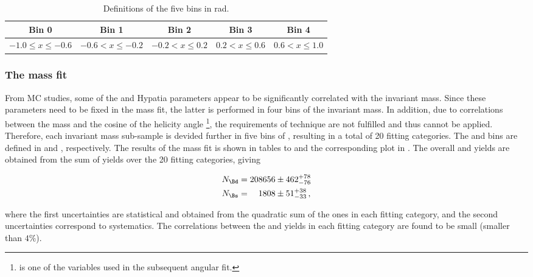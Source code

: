 \begin{table}[!h]
\begin{tabular}{c|c|c|c|c}
\hline
 Bin 0 & Bin 1 & Bin 2 & Bin 3 & Bin 4\\	
\hline
\multirow{2}{*}{$ -1.0 \leq x \leq -0.6 $} & \multirow{2}{*}{$ -0.6 < x \leq -0.2 $} & \multirow{2}{*}{$ -0.2 < x \leq 0.2 $}& \multirow{2}{*}{$ 0.2 < x \leq 0.6 $} & \multirow{2}{*}{$ 0.6 < x \leq 1.0 $} \\
					      	 					  &   &	& & \\	
\hline
 \end{tabular}
\caption{Definitions of the five \cosTmu bins in rad.}
\label{cosThateMubindef} 
\end{table}

\subsubsection{The mass fit}
From MC studies, some of the \Bs and \Bd Hypatia parameters appear to be significantly correlated with the \mkpi invariant mass. 
Since these parameters need to be fixed in the mass fit, the latter is performed in four bins of the
\mkpi invariant mass. In addition, due to correlations between the mass and the cosine of the helicity angle \thetamu\footnote{\cosTmu is one of 
the variables used in the subsequent angular fit.},
the requirements of \sPlot technique are not fulfilled and thus cannot be applied. Therefore, each \mkpi invariant mass sub-sample
is devided further in five bins of \cosTmu, resulting in a total of 20 fitting categories. The \mkpi and \cosTmu bins are defined 
in  and , respectively. The results of the mass fit is shown in tables 
to  and the corresponding plot in . The overall \Bs and \Bd yields are obtained from the sum 
of yields over the 20 fitting categories, giving

\begin{align}
N_{\Bd} &= 208656  \pm  462 ^{+ 78	}_{- 76}\\
N_{\Bs} &= \phantom{00}1808  \pm   51 ^{+ 38	}_{- 33} \, ,
\end{align}

\noindent where the first uncertainties are statistical and obtained from the quadratic sum of the ones in each fitting category, 
and the second uncertainties correspond to systematics. The correlations between the \Bd and \Bs yields in each fitting category
are found to be small (smaller than $4\%$).

